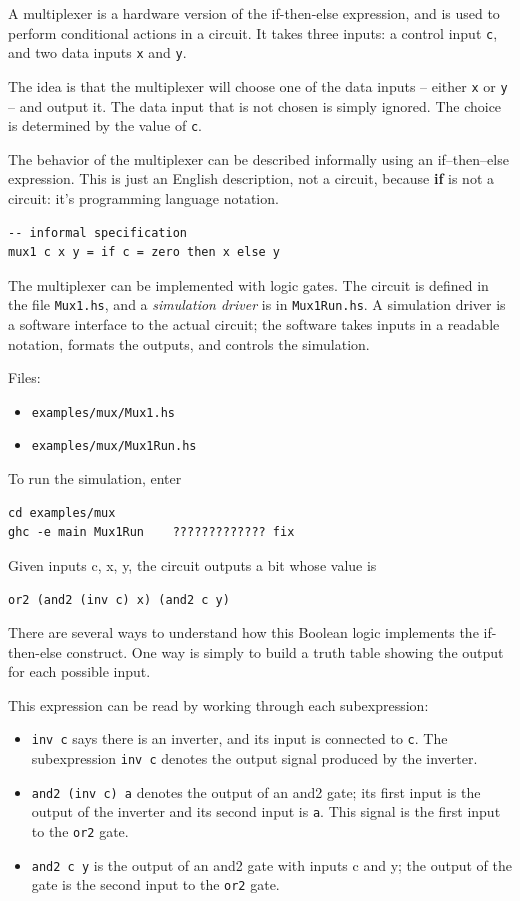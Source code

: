 \documentclass[]{svmono}
\begin{document}
A multiplexer is a hardware version of the if-then-else expression,
and is used to perform conditional actions in a circuit.  It takes
three inputs: a control input \texttt{c}, and two data inputs \texttt{x} and \texttt{y}.

The idea is that the multiplexer will choose one of the data inputs --
either \texttt{x} or \texttt{y} -- and output it.  The data input that is not chosen is
simply ignored.  The choice is determined by the value of \texttt{c}.

The behavior of the multiplexer can be described informally using an
if--then--else expression.  This is just an English description, not a
circuit, because \textbf{if} is not a circuit: it's programming language
notation.

\begin{verbatim}
-- informal specification
mux1 c x y = if c = zero then x else y
\end{verbatim}

The multiplexer can be implemented with logic gates.  The circuit is
defined in the file \texttt{Mux1.hs}, and a \emph{simulation driver} is in
\texttt{Mux1Run.hs}.  A simulation driver is a software interface to the
actual circuit; the software takes inputs in a readable notation,
formats the outputs, and controls the simulation.

Files:
\begin{itemize}
\item \texttt{examples/mux/Mux1.hs}
\item \texttt{examples/mux/Mux1Run.hs}
\end{itemize}

To run the simulation, enter  

\begin{verbatim}
cd examples/mux
ghc -e main Mux1Run    ????????????? fix
\end{verbatim}

Given inputs c, x, y, the circuit outputs a bit whose value is

\begin{verbatim}
or2 (and2 (inv c) x) (and2 c y)
\end{verbatim}

There are several ways to understand how this Boolean logic implements
the if-then-else construct.  One way is simply to build a truth table
showing the output for each possible input.

This expression can be read by working through each subexpression:
\begin{itemize}
\item \texttt{inv c} says there is an inverter, and its input is connected to
\texttt{c}.  The subexpression \texttt{inv c} denotes the output signal produced
by the inverter.
\item \texttt{and2 (inv c) a} denotes the output of an and2 gate; its first input
is the output of the inverter and its second input is \texttt{a}.  This
signal is the first input to the \texttt{or2} gate.
\item \texttt{and2 c y} is the output of an and2 gate with inputs c and y; the
output of the gate is the second input to the \texttt{or2} gate.
\end{itemize}
\end{document}
